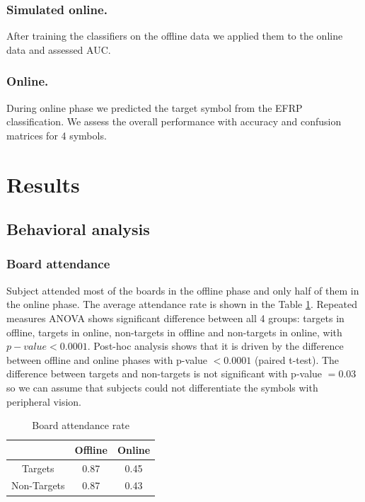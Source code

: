 \documentclass[12pt]{iopart}
\begin{document}
\subsubsection*{Simulated online.}
After training the classifiers on the offline data we applied them 
to the online data and assessed AUC.

\subsubsection*{Online.}
During online phase we predicted the target symbol from the EFRP classification.
We assess the overall performance with accuracy and confusion matrices
for 4 symbols.

\section{Results}
\label{sec:results}
\subsection{Behavioral analysis}

\subsubsection*{Board attendance}
Subject attended most of the boards in the offline phase and only
half of them in the online phase. The average attendance rate
is shown in the Table \ref{tab:boardAtt}.
Repeated measures ANOVA shows significant difference between
all 4 groups: targets in offline, targets  in online,
non-targets in offline and non-targets in online, with $p-value < 0.0001$.
Post-hoc analysis shows that it is driven by the difference between
offline and online phases with p-value $< 0.0001$ (paired t-test).
The difference between targets and non-targets is not significant with p-value $= 0.03$
so we can assume that subjects could not differentiate the symbols
with peripheral vision.

\begin{table}
    \centering
    \caption{Board attendance rate}
    \begin{tabular}{c | c | c}
        \hline 
        & Offline & Online \\
        \hline 
        Targets & 0.87 & 0.45 \\
        Non-Targets & 0.87 & 0.43 \\
        \hline 
    \end{tabular}
    \label{tab:boardAtt}
\end{table}
\end{document}
